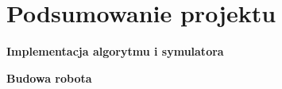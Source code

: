 \section{Podsumowanie projektu}

\textbf{Implementacja algorytmu i symulatora}



\textbf{Budowa robota}